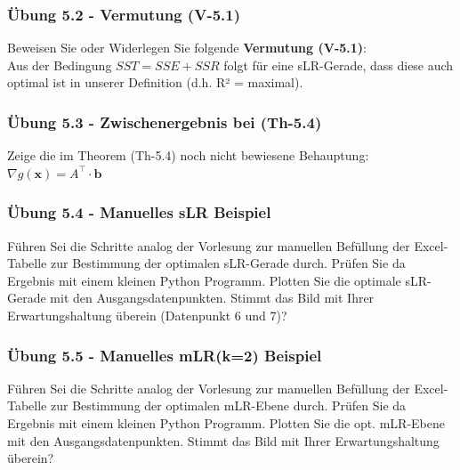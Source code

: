 \documentclass[12pt]{article}
\begin{document}
\subsubsection{Übung 5.2 - Vermutung (V-5.1)}
Beweisen Sie oder Widerlegen Sie folgende \textbf{Vermutung (V-5.1)}:\\[0.2cm]
Aus der Bedingung $ SST = SSE + SSR $ folgt für eine sLR-Gerade, dass diese auch optimal ist in unserer Definition (d.h. R² = maximal).\\

\subsubsection{Übung 5.3 - Zwischenergebnis bei (Th-5.4)}
Zeige die im Theorem (Th-5.4) noch nicht bewiesene Behauptung:\\ 
\hspace*{4.5cm} $ \nabla g(\mathbf{x}) = A^\top \cdot \mathbf{b}$

\subsubsection{Übung 5.4 - Manuelles sLR Beispiel}
Führen Sei die Schritte analog der Vorlesung zur manuellen Befüllung der Excel-Tabelle zur Bestimmung der optimalen sLR-Gerade durch. Prüfen Sie da Ergebnis mit einem kleinen Python Programm. Plotten Sie die optimale sLR-Gerade mit den Ausgangsdatenpunkten. Stimmt das Bild mit Ihrer Erwartungshaltung überein (Datenpunkt 6 und 7)?

\subsubsection{Übung 5.5 - Manuelles mLR(k=2) Beispiel}
Führen Sei die Schritte analog der Vorlesung zur manuellen Befüllung der Excel-Tabelle zur Bestimmung der optimalen mLR-Ebene durch. Prüfen Sie da Ergebnis mit einem kleinen Python Programm. Plotten Sie die opt. mLR-Ebene mit den Ausgangsdatenpunkten. Stimmt das Bild mit Ihrer Erwartungshaltung überein?
\end{document}
